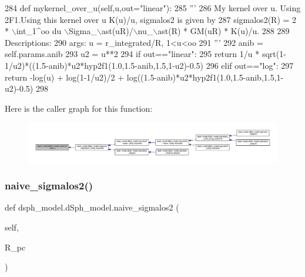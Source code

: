 \begin{DoxyCode}
284     \textcolor{keyword}{def }mykernel\_over\_u(self,u,out="linear"):
285         \textcolor{stringliteral}{'''}
286 \textcolor{stringliteral}{        My kernel over u. Using 2F1.Using this kernel over u K(u)/u, sigmalos2 is given by}
287 \textcolor{stringliteral}{            sigmalos2(R) = 2 * \(\backslash\)int\_1^oo du \(\backslash\)Sigma\_\(\backslash\)ast(uR)/\(\backslash\)nu\_\(\backslash\)ast(R) * GM(uR) * K(u)/u.}
288 \textcolor{stringliteral}{            }
289 \textcolor{stringliteral}{        Descriptions:}
290 \textcolor{stringliteral}{            args: u = r\_integrated/R, 1<u<oo}
291 \textcolor{stringliteral}{        '''}
292         anib = self.params.anib
293         u2 = u**2
294         \textcolor{keywordflow}{if} out==\textcolor{stringliteral}{"linear"}:
295             \textcolor{keywordflow}{return} 1/u * sqrt(1-1/u2)*((1.5-anib)*u2*hyp2f1(1.0,1.5-anib,1.5,1-u2)-0.5)
296         \textcolor{keywordflow}{elif} out==\textcolor{stringliteral}{"log"}:
297             \textcolor{keywordflow}{return} -log(u) + log(1-1/u2)/2 + log((1.5-anib)*u2*hyp2f1(1.0,1.5-anib,1.5,1-u2)-0.5)
298 
\end{DoxyCode}
Here is the caller graph for this function\+:
\nopagebreak
\begin{figure}[H]
\begin{center}
\leavevmode
\includegraphics[width=350pt]{d0/d25/classdsph__model_1_1dSph__model_a5e0091742da19919dc6c085a806ad6e0_icgraph}
\end{center}
\end{figure}
\mbox{\label{classdsph__model_1_1dSph__model_a9db5b642eb5007933136db35b3acf84a}} 
\subsubsection{\texorpdfstring{naive\+\_\+sigmalos2()}{naive\_sigmalos2()}}
{\footnotesize\ttfamily def dsph\+\_\+model.\+d\+Sph\+\_\+model.\+naive\+\_\+sigmalos2 (\begin{DoxyParamCaption}\item[{}]{self,  }\item[{}]{R\+\_\+pc }\end{DoxyParamCaption})}




